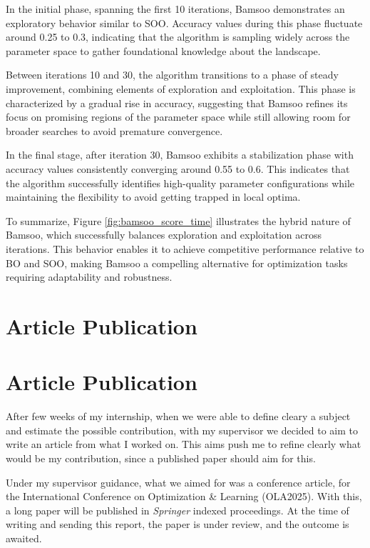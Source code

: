 In the initial phase, spanning the first 10 iterations, Bamsoo demonstrates an exploratory behavior similar to SOO. Accuracy values during this phase fluctuate around 0.25 to 0.3, indicating that the algorithm is sampling widely across the parameter space to gather foundational knowledge about the landscape.

Between iterations 10 and 30, the algorithm transitions to a phase of steady improvement, combining elements of exploration and exploitation. This phase is characterized by a gradual rise in accuracy, suggesting that Bamsoo refines its focus on promising regions of the parameter space while still allowing room for broader searches to avoid premature convergence.

In the final stage, after iteration 30, Bamsoo exhibits a stabilization phase with accuracy values consistently converging around 0.55 to 0.6. This indicates that the algorithm successfully identifies high-quality parameter configurations while maintaining the flexibility to avoid getting trapped in local optima.

To summarize, Figure \ref{fig:bamsoo_score_time} illustrates the hybrid nature of Bamsoo, which successfully balances exploration and exploitation across iterations. This behavior enables it to achieve competitive performance relative to BO and SOO, making Bamsoo a compelling alternative for optimization tasks requiring adaptability and robustness.

\section{Article Publication}
\label{sec:article}


\section{Article Publication}
\label{sec:article}

After few weeks of my internship, when we were able to define cleary a subject and estimate the possible contribution, with my supervisor we decided to aim to write an article from what I worked on. This aims push me to refine clearly what would be my contribution, since a published paper should aim for this. 

Under my supervisor guidance, what we aimed for was a conference article, for the International Conference on Optimization \& Learning (OLA2025). With this, a long paper will be published in \textit{Springer} indexed proceedings. At the time of writing and sending this report, the paper is under review, and the outcome is awaited.

